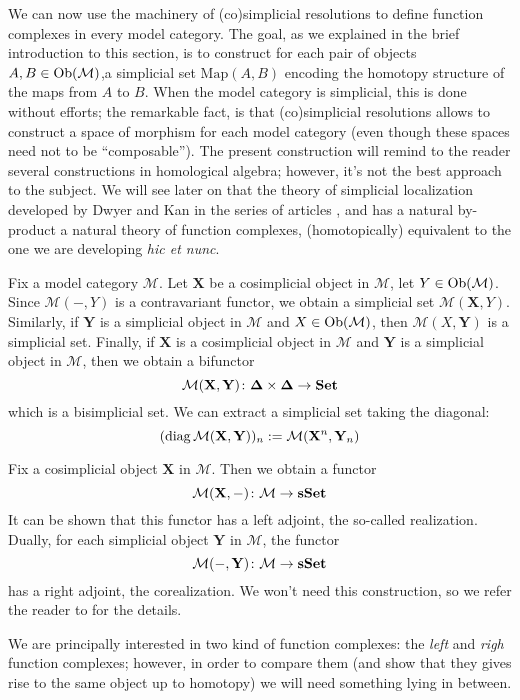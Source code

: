 We can now use the machinery of (co)simplicial resolutions to define function complexes in every model category. The goal, as we explained in the brief introduction to this section, is to construct for each pair of objects $A,B \in \mathrm{Ob}(\mathcal M)$,a simplicial set $\mathrm{Map}(A,B)$ encoding the homotopy structure of the maps from $A$ to $B$. When the model category is simplicial, this is done without efforts; the remarkable fact, is that (co)simplicial resolutions allows to construct a space of morphism for each model category (even though these spaces need not to be ``composable''). The present construction will remind to the reader several constructions in homological algebra; however, it's not the best approach to the subject. We will see later on that the theory of simplicial localization developed by Dwyer and Kan in the series of articles \cite{dksimplicial}, \cite{dkcomputing} and \cite{dkfunction} has a natural by-product a natural theory of function complexes, (homotopically) equivalent to the one we are developing \emph{hic et nunc}.

Fix a model category $\mathcal M$. Let $\mathbf{X}$ be a cosimplicial object in $\mathcal M$, let $Y \in \mathrm{Ob}(\mathcal M)$. Since $\mathcal M(-,Y)$ is a contravariant functor, we obtain a simplicial set $\mathcal M(\mathbf X,Y)$. Similarly, if $\mathbf Y$ is a simplicial object in $\mathcal M$ and $X \in \mathrm{Ob}(\mathcal M)$, then $\mathcal M(X,\mathbf Y)$ is a simplicial set. Finally, if $\mathbf X$ is a cosimplicial object in $\mathcal M$ and $\mathbf Y$ is a simplicial object in $\mathcal M$, then we obtain a bifunctor
\[
\mathcal M(\mathbf X,\mathbf Y) \colon \mathbf \Delta \times \mathbf \Delta \to \mathbf{Set}
\]
which is a bisimplicial set. We can extract a simplicial set taking the diagonal:
\[
(\mathrm{diag} \, \mathcal M(\mathbf X,\mathbf Y))_n := \mathcal M(\mathbf X^n,\mathbf Y_n)
\]

\begin{rmk}
Fix a cosimplicial object $\mathbf X$ in $\mathcal M$. Then we obtain a functor
\[
\mathcal M(\mathbf X, -) \colon \mathcal M \to \mathbf{sSet}
\]
It can be shown that this functor has a left adjoint, the so-called realization. Dually, for each simplicial object $\mathbf Y$ in $\mathcal M$, the functor
\[
\mathcal M(-,\mathbf Y) \colon \mathcal M \to \mathbf{sSet}
\]
has a right adjoint, the corealization. We won't need this construction, so we refer the reader to \cite[Ch. 16.3]{hirschhorn} for the details.
\end{rmk}

We are principally interested in two kind of function complexes: the \emph{left} and \emph{righ} function complexes; however, in order to compare them (and show that they gives rise to the same object up to homotopy) we will need something lying in between.

